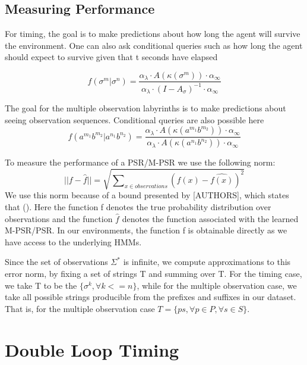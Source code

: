 \subsection{Measuring Performance}
For timing, the goal is to make predictions about how long the agent will survive the environment. One can also ask conditional queries such as how long the agent should expect to survive given that t seconds have elapsed

\begin{equation*}
f(\sigma^m|\sigma^n) = \dfrac{\alpha_{\lambda} \cdot A(\kappa(\sigma^m)) \cdot \alpha_\infty}{\alpha_\lambda \cdot (I-A_{\sigma})^{-1} \cdot \alpha_{\infty} }
\end{equation*}

The goal for the multiple observation labyrinths is to make predictions about seeing observation sequences. Conditional queries are also possible here 
\begin{equation*}
f(a^{m_1}b^{m_2}|a^{n_1}b^{n_2}) = \dfrac{\alpha_{\lambda} \cdot A(\kappa(a^{m_1}b^{m_2})) \cdot \alpha_\infty}{\alpha_\lambda \cdot A(\kappa(a^{n_1}b^{n_2})) \cdot \alpha_{\infty} }
\end{equation*}

To measure the performance of a PSR/M-PSR we use the following norm:
\begin{equation*}
||f - \hat{f}|| = \sqrt{\sum\nolimits_{x \in observations}(f(x) - \hat{f(x)})^2}
\end{equation*}
We use this norm because of a bound presented by [AUTHORS], which states that (). Here the function f denotes the true probability distribution over observations and the function $\hat{f}$ denotes the function associated with the learned M-PSR/PSR. In our environments, the function f is obtainable directly as we have access to the underlying HMMs.

Since the set of observations $\Sigma^*$ is infinite, we compute approximations to this error norm, by fixing a set of strings T and summing over T. For the timing case, we take T to be the $\{\sigma^k, \forall k<=n\}$, while for the multiple observation case, we take all possible strings producible from the prefixes and suffixes in our dataset. That is, for the multiple observation case $T = \{ps, \forall p \in P, \forall s \in S\}$.

\section{Double Loop Timing}

